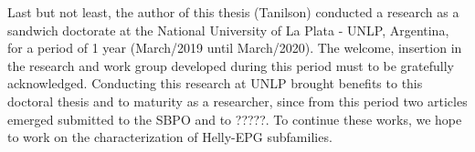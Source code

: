 Last but not least, the author of this thesis (Tanilson) conducted a research as a sandwich doctorate at the National University of La Plata - UNLP, Argentina, for a period of 1 year (March/2019 until March/2020). The welcome, insertion in the research and work group developed during this period must to be gratefully acknowledged. Conducting this research at UNLP brought benefits to this doctoral thesis and to maturity as a researcher, since from this period two articles emerged submitted to the SBPO and to ?????. To continue these works, we hope to work on the characterization of Helly-EPG subfamilies.






